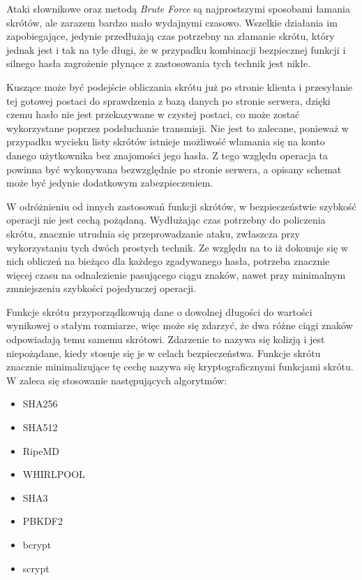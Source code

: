 \documentclass[11pt]{aghdpl}
\begin{document}
Ataki słownikowe oraz metodą \emph{Brute Force} są najprostszymi sposobami łamania skrótów, ale zarazem bardzo mało wydajnymi czasowo. Wszelkie działania im zapobiegające, jedynie przedłużają czas potrzebny na złamanie skrótu, który jednak jest i tak na tyle długi, że w przypadku kombinacji bezpiecznej funkcji i silnego hasła zagrożenie płynące z zastosowania tych technik jest nikłe.

Kuszące może być podejście obliczania skrótu już po stronie klienta i przesyłanie tej gotowej postaci do sprawdzenia z bazą danych po stronie serwera, dzięki czemu hasło nie jest przekazywane w czystej postaci, co może zostać wykorzystane poprzez podsłuchanie transmisji. Nie jest to zalecane, ponieważ w przypadku wycieku listy skrótów istnieje możliwość włamania się na konto danego użytkownika bez znajomości jego hasła. Z tego względu operacja ta powinna być wykonywana bezwzględnie po stronie serwera, a opisany schemat może być jedynie dodatkowym zabezpieczeniem.

W odróżnieniu od innych zastosowań funkcji skrótów, w bezpieczeństwie szybkość operacji nie jest cechą pożądaną. Wydłużając czas potrzebny do policzenia skrótu, znacznie utrudnia się przeprowadzanie ataku, zwłaszcza przy wykorzystaniu tych dwóch prostych technik. Ze względu na to iż dokonuje się w nich obliczeń na bieżąco dla każdego zgadywanego hasła, potrzeba znacznie więcej czasu na odnalezienie pasującego ciągu znaków, nawet przy minimalnym zmniejszeniu szybkości pojedynczej operacji.

Funkcje skrótu przyporządkowują dane o dowolnej długości do wartości wynikowej o stałym rozmiarze, więc może się zdarzyć, że dwa różne ciągi znaków odpowiadają temu samemu skrótowi. Zdarzenie to nazywa się kolizją i jest niepożądane, kiedy stosuje się je w celach bezpieczeństwa. Funkcje skrótu znacznie minimalizujące tę cechę nazywa się kryptograficznymi funkcjami skrótu. W \cite{CSH} zaleca się stosowanie następujących algorytmów:

\begin{itemize}
\item SHA256
\item SHA512
\item RipeMD
\item WHIRLPOOL
\item SHA3
\item PBKDF2
\item bcrypt
\item scrypt		
\end{itemize}
\end{document}
